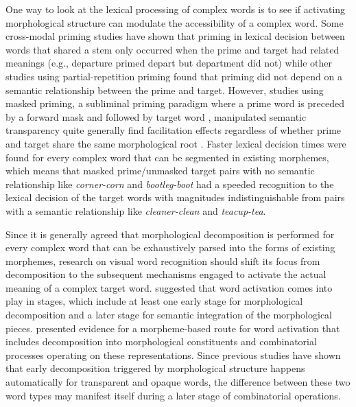 \documentclass{frontiersSCNS}
\begin{document}
	One way to look at the lexical processing of complex words is to see if activating morphological structure can modulate the accessibility of a complex word. Some cross-modal priming studies \citep{Marslen-Wilson:1994} have shown that priming in lexical decision between words that shared a stem only occurred when the prime and target had related meanings (e.g., departure primed depart but department did not) while other studies \citep*{Zwitserlood:1994} using partial-repetition priming found that priming did not depend on a semantic relationship between the prime and target. However, studies using masked priming, a subliminal priming paradigm where a prime word is preceded by a forward mask and followed by target word \citep*{Forster:1984}, manipulated semantic transparency quite generally find facilitation effects regardless of whether prime and target share the same morphological root \citep*{Rastle:2004, Longtin:2003, Fiorentino:2007, McCormick:2008}.  Faster lexical decision times were found for every complex word that can be segmented in existing morphemes, which means that masked prime/unmasked target pairs with no semantic relationship like \textit{corner-corn} and \textit{bootleg-boot} had a speeded recognition to the lexical decision of the target words with magnitudes indistinguishable from pairs with a semantic relationship like \textit{cleaner-clean} and \textit{teacup-tea}.

	Since it is generally agreed that morphological decomposition is performed for every complex word that can be exhaustively parsed into the forms of existing morphemes, research on visual word recognition should shift its focus from decomposition to the subsequent mechanisms engaged to activate the actual meaning of a complex target word.  \citet*{Meunier:2007} suggested that word activation comes into play in stages, which include at least one early stage for morphological decomposition and a later stage for semantic integration of the morphological pieces. \citet{Fiorentino:2013} presented evidence for a morpheme-based route for word activation that includes decomposition into morphological constituents and combinatorial processes operating on these representations.  Since previous studies have shown that early decomposition triggered by morphological structure happens automatically for transparent and opaque words, the difference between these two word types may manifest itself during a later stage of combinatorial operations.
\end{document}
